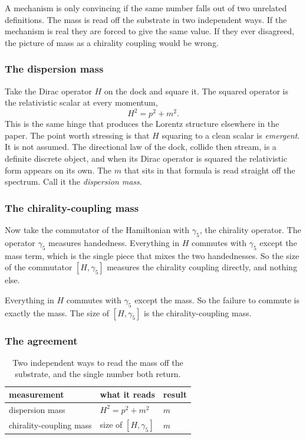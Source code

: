 A mechanism is only convincing if the same number falls out of two unrelated definitions. The mass is read off the substrate in two independent ways. If the mechanism is real they are forced to give the same value. If they ever disagreed, the picture of mass as a chirality coupling would be wrong.

\subsubsection{The dispersion mass}

Take the Dirac operator $H$ on the dock and square it. The squared operator is the relativistic scalar at every momentum,
\[
H^2 = p^2 + m^2 .
\]
This is the same hinge that produces the Lorentz structure elsewhere in the paper. The point worth stressing is that $H$ squaring to a clean scalar is \emph{emergent}. It is not assumed. The directional law of the dock, collide then stream, is a definite discrete object, and when its Dirac operator is squared the relativistic form appears on its own. The $m$ that sits in that formula is read straight off the spectrum. Call it the \emph{dispersion mass}.

\subsubsection{The chirality-coupling mass}

Now take the commutator of the Hamiltonian with $\gamma_5$, the chirality operator. The operator $\gamma_5$ measures handedness. Everything in $H$ commutes with $\gamma_5$ except the mass term, which is the single piece that mixes the two handednesses. So the size of the commutator $[H, \gamma_5]$ measures the chirality coupling directly, and nothing else.

\begin{principle}
Everything in $H$ commutes with $\gamma_5$ except the mass. So the failure to commute is exactly the mass. The size of $[H, \gamma_5]$ is the chirality-coupling mass.
\end{principle}

\subsubsection{The agreement}

\begin{table}[ht]
\centering
\begin{tabular}{@{}lll@{}}
\toprule
measurement & what it reads & result \\
\midrule
dispersion mass & $H^2 = p^2 + m^2$ & $m$ \\
chirality-coupling mass & size of $[H, \gamma_5]$ & $m$ \\
\bottomrule
\end{tabular}
\caption{Two independent ways to read the mass off the substrate, and the single number both return.}
\label{tab:two-masses}
\end{table}

